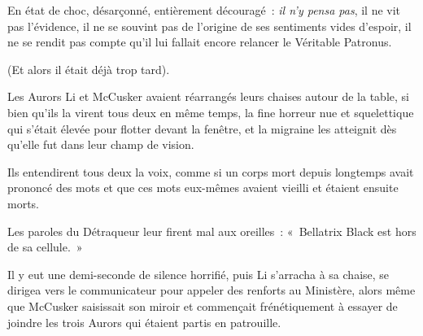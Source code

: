 En état de choc, désarçonné, entièrement découragé~: \emph{il n'y pensa pas}, il ne vit pas l'évidence, il ne se souvint pas de l'origine de ses sentiments vides d'espoir, il ne se rendit pas compte qu'il lui fallait encore relancer le Véritable Patronus.

(Et alors il était déjà trop tard).

\later

Les Aurors Li et McCusker avaient réarrangés leurs chaises autour de la table, si bien qu'ils la virent tous deux en même temps, la fine horreur nue et squelettique qui s'était élevée pour flotter devant la fenêtre, et la migraine les atteignit dès qu'elle fut dans leur champ de vision.

Ils entendirent tous deux la voix, comme si un corps mort depuis longtemps avait prononcé des mots et que ces mots eux-mêmes avaient vieilli et étaient ensuite morts.

Les paroles du Détraqueur leur firent mal aux oreilles~: «~Bellatrix Black est hors de sa cellule.~»

Il y eut une demi-seconde de silence horrifié, puis Li s'arracha à sa chaise, se dirigea vers le communicateur pour appeler des renforts au Ministère, alors même que McCusker saisissait son miroir et commençait frénétiquement à essayer de joindre les trois Aurors qui étaient partis en patrouille.
